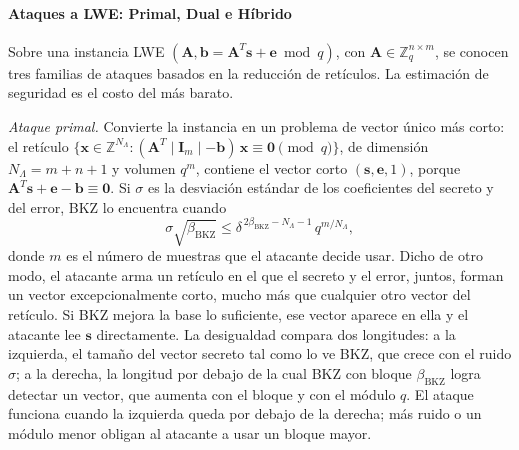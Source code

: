 \paragraph{Ataques a LWE: Primal, Dual e Híbrido}
Sobre una instancia LWE $(\mathbf{A}, \mathbf{b} = \mathbf{A}^T\mathbf{s} + \mathbf{e} \bmod q)$, con $\mathbf{A} \in \mathbb{Z}_q^{n \times m}$, se conocen tres familias de ataques basados en la reducción de retículos. La estimación de seguridad es el costo del más barato.

\textit{Ataque primal.} Convierte la instancia en un problema de vector único más corto: el retículo $\{\mathbf{x} \in \mathbb{Z}^{N_\Lambda} : (\mathbf{A}^T \mid \mathbf{I}_m \mid -\mathbf{b})\,\mathbf{x} \equiv \mathbf{0} \pmod q\}$, de dimensión $N_\Lambda = m + n + 1$ y volumen $q^m$, contiene el vector corto $(\mathbf{s}, \mathbf{e}, 1)$, porque $\mathbf{A}^T\mathbf{s} + \mathbf{e} - \mathbf{b} \equiv \mathbf{0}$. Si $\sigma$ es la desviación estándar de los coeficientes del secreto y del error, BKZ lo encuentra cuando \cite{alkim2016newhope, avanzi2021kyber}
\begin{equation}
\sigma \sqrt{\beta_{\mathrm{BKZ}}} \le \delta^{\,2\beta_{\mathrm{BKZ}} - N_\Lambda - 1}\, q^{m/N_\Lambda},
\end{equation}
donde $m$ es el número de muestras que el atacante decide usar. Dicho de otro modo, el atacante arma un retículo en el que el secreto y el error, juntos, forman un vector excepcionalmente corto, mucho más que cualquier otro vector del retículo. Si BKZ mejora la base lo suficiente, ese vector aparece en ella y el atacante lee $\mathbf{s}$ directamente. La desigualdad compara dos longitudes: a la izquierda, el tamaño del vector secreto tal como lo ve BKZ, que crece con el ruido $\sigma$; a la derecha, la longitud por debajo de la cual BKZ con bloque $\beta_{\mathrm{BKZ}}$ logra detectar un vector, que aumenta con el bloque y con el módulo $q$. El ataque funciona cuando la izquierda queda por debajo de la derecha; más ruido o un módulo menor obligan al atacante a usar un bloque mayor.

